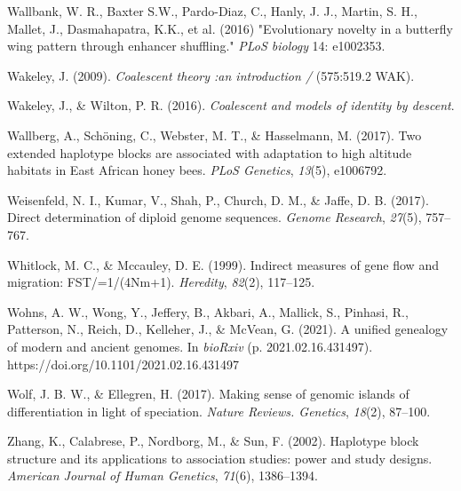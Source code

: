 \documentclass[twocolumn]{bmcart}%
\begin{document}
\begin{backmatter}
Wallbank, W. R., Baxter S.W., Pardo-Diaz, C., Hanly, J. J., Martin, S.
H., Mallet, J., Dasmahapatra, K.K., et al. (2016) "Evolutionary novelty
in a butterfly wing pattern through enhancer shuffling." \emph{PLoS
biology} 14: e1002353.

Wakeley, J. (2009). \emph{Coalescent theory :an introduction /}
(575:519.2 WAK). 

Wakeley, J., \& Wilton, P. R. (2016). \emph{Coalescent and models of
identity by descent}.

Wallberg, A., Schöning, C., Webster, M. T., \& Hasselmann, M. (2017).
Two extended haplotype blocks are associated with adaptation to high
altitude habitats in East African honey bees. \emph{PLoS Genetics},
\emph{13}(5), e1006792.

Weisenfeld, N. I., Kumar, V., Shah, P., Church, D. M., \& Jaffe, D. B.
(2017). Direct determination of diploid genome sequences. \emph{Genome
Research}, \emph{27}(5), 757--767.

Whitlock, M. C., \& Mccauley, D. E. (1999). Indirect measures of gene
flow and migration: FST/=1/(4Nm+1). \emph{Heredity}, \emph{82}(2),
117--125.

Wohns, A. W., Wong, Y., Jeffery, B., Akbari, A., Mallick, S., Pinhasi,
R., Patterson, N., Reich, D., Kelleher, J., \& McVean, G. (2021). A
unified genealogy of modern and ancient genomes. In \emph{bioRxiv} (p.
2021.02.16.431497). https://doi.org/10.1101/2021.02.16.431497

Wolf, J. B. W., \& Ellegren, H. (2017). Making sense of genomic islands
of differentiation in light of speciation. \emph{Nature Reviews.
Genetics}, \emph{18}(2), 87--100.

Zhang, K., Calabrese, P., Nordborg, M., \& Sun, F. (2002). Haplotype
block structure and its applications to association studies: power and
study designs. \emph{American Journal of Human Genetics}, \emph{71}(6),
1386--1394.





\end{backmatter}
\end{document}
